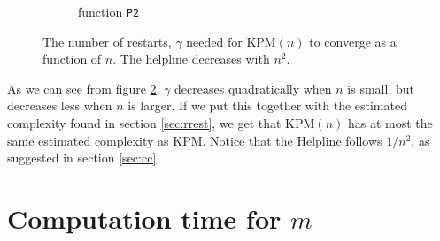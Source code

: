 \begin{figure}[H]
\begin{subfigure}[b]{0.45\textwidth}
                \caption{function \texttt{P2}}
                \label{fig:ant2}
        \end{subfigure}
        \caption{The number of restarts, $\gamma$ needed for KPM$(n)$ to converge as a function of $n$. The helpline decreases with $n^2$.}\label{fig:ant}
\end{figure}
As we can see from figure \ref{fig:ant}, $\gamma$ decreases quadratically when $n$ is small, but decreases less when $n$ is larger. If we put this together with the estimated complexity found in section \ref{sec:rrest}, we get that KPM$(n)$ has at most the same estimated complexity as KPM. Notice that the Helpline follows $1/n^2$, as suggested in section \ref{sec:cc}.
\section{Computation time for $m$} \label{sec:stimem}
